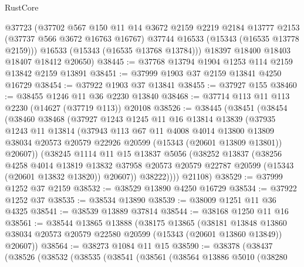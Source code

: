 \begin{lexlean}{RustCore}
\begin{coremodule}
        @37723
        (@37702
          @567
          @150
          @11
          @14
          @3672
          @2159
          @2219
          @2184
          @13777
          @2153
          (@37737 @566 @3672 @16763 @16767)
          @37744
          @16533
          (@15343 (@16535 @13778 @2159)))
        @16533
        (@15343 (@16535 @13768 @13784)))
      @18397
      @18400
      @18403
      @18407
      @18412
      @20650)
@38445 := @37768 @13794 @1904 @1253 @114 @2159 @13842 @2159 @13891
@38451 := @37999 @1903 @37 @2159 @13841 @4250 @16729
@38454 := @37922 @1903 @37 @13841
@38455 := @37927 @155
@38460 := @38455 @1246 @11 @36 @2230 @13840
@38468 := @37714 @113 @11 @113 @2230 (@14627 (@37719 @113)) @20108
@38526 := @38445
    (@38451
      (@38454
        (@38460
          @38468
          (@37927
            @1243
            @1245
            @11
            @16
            @13814
            @13839
            (@37935
              @1243
              @11
              @13814
              (@37943
                @113
                @67
                @11
                @4008
                @4014
                @13800
                @13809
                @38034
                @20573
                @20579
                @22926
                @20599
                (@15343 (@20601 @13809 @13801))
                @20607))
            (@38245
              @1114
              @11
              @15
              @13837
              @5056
              (@38252
                @13837
                (@38256
                  @4258
                  @4014
                  @13819
                  @13832
                  @37958
                  @20573
                  @20579
                  @22787
                  @20599
                  (@15343 (@20601 @13832 @13820))
                  @20607))
              @38222))))
      @21108)
@38529 := @37999 @1252 @37 @2159
@38532 := @38529 @13890 @4250 @16729
@38534 := @37922 @1252 @37
@38535 := @38534 @13890
@38539 := @38009 @1251 @11 @36 @4325
@38541 := @38539 @13889 @37814
@38544 := @38168 @1250 @11 @16
@38561 := @38544
    @13865
    @13888
    (@38175
      @13865
      (@38181
        @13848
        @13860
        @38034
        @20573
        @20579
        @22580
        @20599
        (@15343 (@20601 @13860 @13849))
        @20607))
@38564 := @38273 @1084 @11 @15
@38590 := @38378
    (@38437
      (@38526
        (@38532
          (@38535
            (@38541
              (@38561
                (@38564
                  @13886
                  @5010
                  (@38280

\end{coremodule}
\end{lexlean}
